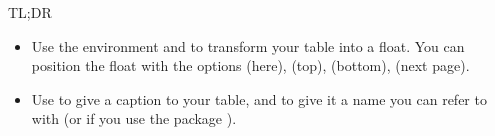 \begin{infobox}{TL;DR}
	\begin{itemize}
		\item Use the environment  and  to transform your table into a float. You can position the float with the options  (here),  (top),  (bottom),  (next page).
		\item Use  to give a caption to your table, and  to give it a name you can refer to with  (or  if you use the package ).
	\end{itemize}
\end{infobox}
